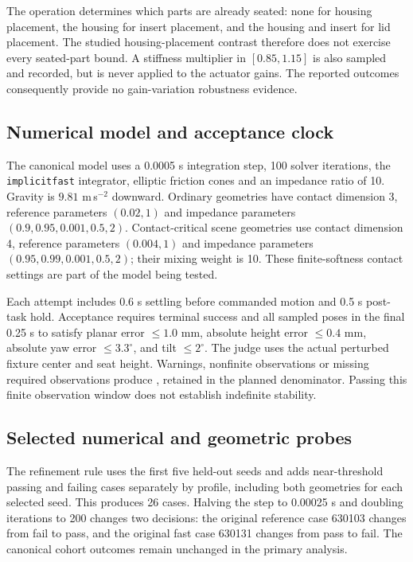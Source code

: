 The operation determines which parts are already seated: none for housing placement, the housing for insert placement, and the housing and insert for lid placement. The studied housing-placement contrast therefore does not exercise every seated-part bound. A stiffness multiplier in $[0.85,1.15]$ is also sampled and recorded, but is never applied to the actuator gains. The reported outcomes consequently provide no gain-variation robustness evidence.

\subsection{Numerical model and acceptance clock}
The canonical model uses a 0.0005 s integration step, 100 solver iterations, the \texttt{implicitfast} integrator, elliptic friction cones and an impedance ratio of 10. Gravity is $9.81$ m\,s$^{-2}$ downward. Ordinary geometries have contact dimension 3, reference parameters $(0.02,1)$ and impedance parameters $(0.9,0.95,0.001,0.5,2)$. Contact-critical scene geometries use contact dimension 4, reference parameters $(0.004,1)$ and impedance parameters $(0.95,0.99,0.001,0.5,2)$; their mixing weight is 10. These finite-softness contact settings are part of the model being tested.

Each attempt includes 0.6 s settling before commanded motion and 0.5 s post-task hold. Acceptance requires terminal success and all sampled poses in the final 0.25 s to satisfy planar error $\leq1.0$ mm, absolute height error $\leq0.4$ mm, absolute yaw error $\leq3.3^\circ$, and tilt $\leq2^\circ$. The judge uses the actual perturbed fixture center and seat height. Warnings, nonfinite observations or missing required observations produce , retained in the planned denominator. Passing this finite observation window does not establish indefinite stability.

\subsection{Selected numerical and geometric probes}
The refinement rule uses the first five held-out seeds and adds near-threshold passing and failing cases separately by profile, including both geometries for each selected seed. This produces 26 cases. Halving the step to 0.00025 s and doubling iterations to 200 changes two decisions: the original reference case 630103 changes from fail to pass, and the original fast case 630131 changes from pass to fail. The canonical cohort outcomes remain unchanged in the primary analysis.

